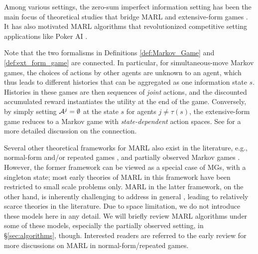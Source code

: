 Among various settings, the zero-sum imperfect information setting has been the main focus of theoretical studies that bridge MARL and extensive-form games \cite{zinkevich2008regret,heinrich2015fictitious,srinivasan2018actor,omidshafiei2019neural}. It has also motivated MARL algorithms that  revolutionized competitive  setting applications like Poker AI \cite{rubin2011computer,brown2019superhuman}. 


\vspace{7pt}
\vspace{5pt}

Note that the two formalisms in Definitions \ref{def:Markov_Game} and \ref{def:ext_form_game} are connected. In particular, for simultaneous-move Markov games, the choices of actions by other agents are unknown to an agent, which thus  leads  to different histories that can be aggregated as one information state $s$. Histories in these games are then  sequences of \emph{joint} actions, and the discounted accumulated reward instantiates the utility at the end of the game. 
Conversely, by simply setting $\mathcal{A}^j=\emptyset$ at the state $s$ for agents $j\neq \tau(s)$, the extensive-form game reduces to a Markov game with \emph{state-dependent} action spaces. See \cite{lanctot2019openspiel} for a more detailed discussion on the  connection.


\begin{remark}
	{{Several other theoretical frameworks for MARL also exist in the literature, e.g.,  normal-form and/or  repeated games  \cite{claus1998dynamics,bowling2001rational,kapetanakis2002reinforcement,conitzer2007awesome}, and partially observed Markov games \cite{hansen2004dynamic,amato2013decentralized,amato2015scalable}. 
However, the former framework can be viewed as a special case of MGs, with a singleton state; most early theories of  MARL in this framework have been   restricted to small scale problems  \cite{bowling2001rational,conitzer2007awesome,kapetanakis2002reinforcement} only. 
MARL in the latter framework, on the other hand, is inherently challenging to address in general \cite{bernstein2002complexity,hansen2004dynamic}, leading to relatively scarce theories in the literature.   Due to space limitation,   we do not introduce these models here  in any detail. We will briefly review  MARL algorithms under some of these models, especially the partially observed setting, in    \S\ref{sec:algorithms}, though. Interested readers are referred to  the early review \cite{bu2008comprehensive} for more discussions on MARL in normal-form/repeated games. }}
\end{remark}  
